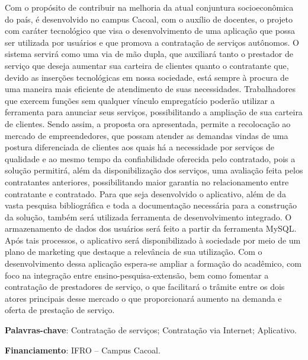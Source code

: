 \documentclass[article,12pt,onesidea,4paper,english,brazil]{abntex2}
\begin{document}
	\noindent Com o propósito de contribuir na melhoria da atual conjuntura socioeconômica do
	país, é desenvolvido no campus Cacoal, com o auxílio de docentes, o projeto com
	caráter tecnológico que visa o desenvolvimento de uma aplicação que possa ser
	utilizada por usuários e que promova a contratação de serviços autônomos. O
	sistema servirá como uma via de mão dupla, que auxiliará tanto o prestador de
	serviço que deseja aumentar sua carteira de clientes quanto o contratante que,
	devido as inserções tecnológicas em nossa sociedade, está sempre à procura de
	uma maneira mais eficiente de atendimento de suas necessidades. Trabalhadores
	que exercem funções sem qualquer vínculo empregatício poderão utilizar a
	ferramenta para anunciar seus serviços, possibilitando a ampliação de sua carteira
	de clientes. Sendo assim, a proposta ora apresentada, permite a recolocação ao
	mercado de empreendedores, que possam atender as demandas vindas de uma
	postura diferenciada de clientes aos quais há a necessidade por serviços de
	qualidade e ao mesmo tempo da confiabilidade oferecida pelo contratado, pois a
	solução permitirá, além da disponibilização dos serviços, uma avaliação feita pelos
	contratantes anteriores, possibilitando maior garantia no relacionamento entre
	contratante e contratado. Para que seja desenvolvido o aplicativo, além de da vasta
	pesquisa bibliográfica e toda a documentação necessária para a construção da
	solução, também será utilizada ferramenta de desenvolvimento integrado. O
	armazenamento de dados dos usuários será feito a partir da ferramenta MySQL.
	Após tais processos, o aplicativo será disponibilizado à sociedade por meio de um
	plano de marketing que destaque a relevância de sua utilização. Com o
	desenvolvimento dessa aplicação espera-se ampliar a formação do acadêmico, com
	foco na integração entre ensino-pesquisa-extensão, bem como fomentar a
	contratação de prestadores de serviço, o que facilitará o trâmite entre os dois atores
	principais desse mercado o que proporcionará aumento na demanda e oferta de
	prestação de serviço.
	
	\vspace{\onelineskip}
	
	\noindent
	\textbf{Palavras-chave}: Contratação de serviços; Contratação via Internet; Aplicativo.
	
	\noindent
	\textbf{Financiamento}: IFRO – Campus Cacoal.
	
\end{document}
